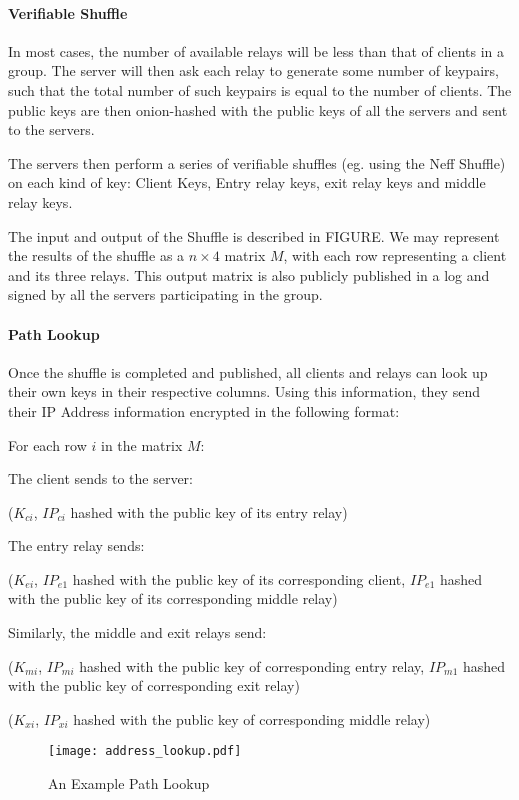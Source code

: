 \paragraph{Verifiable Shuffle} 
In most cases, the number of available relays will be less than that of clients 
in a group. The server will then ask each relay to generate some number of 
keypairs, such that the total number of such keypairs is equal to the number of 
clients. The public keys are then onion-hashed with the public keys of all the 
servers and sent to the servers.

The servers then perform a series of verifiable shuffles (eg. using the Neff
Shuffle) on each kind of key: Client Keys, Entry relay keys, exit relay keys and 
middle relay keys.

The input and output of the Shuffle is described in FIGURE. We may represent the
results of the shuffle as a $n \times 4$ matrix $M$, with each row representing 
a client and its three relays. This output matrix is also publicly published in 
a log and signed by all the servers participating in the group.

\paragraph{Path Lookup}
Once the shuffle is completed and published, all clients and relays can look up
their own keys in their respective columns. Using this information, they send 
their IP Address information encrypted in the following format:

For each row $i$ in the matrix $M$:

The client sends to the server:

($K_{ci}$, {$IP_{ci}$ hashed with the public key of its entry relay})

The entry relay sends:

($K_{ei}$, {$IP_{e1}$ hashed with the public key of its corresponding client}, 
{$IP_{e1}$ hashed with the public key of its corresponding middle relay})

Similarly, the middle and exit relays send:

($K_{mi}$, {$IP_{mi}$ hashed with the public key of corresponding entry relay}, 
{$IP_{m1}$ hashed with the public key of corresponding exit relay})

($K_{xi}$, {$IP_{xi}$ hashed with the public key of corresponding middle relay})

\begin{figure}
  \centering
    \texttt{[image: address\_lookup.pdf]}
  \caption{An Example Path Lookup}
\end{figure}

